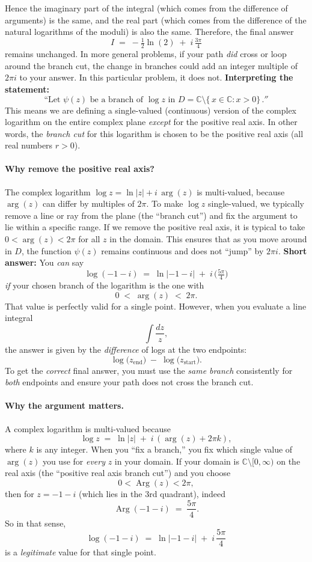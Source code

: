 \documentclass[12pt]{article}
\DeclareMathOperator{\Arg}{Arg}
\theoremstyle{definition} %
\theoremstyle{plain} %
\begin{document}
Hence the imaginary part of the integral (which comes from the difference of arguments) is the same, and the real part (which comes from the difference of the natural logarithms of the moduli) is also the same.  Therefore, the final answer
\[
I
\;=\;
-\tfrac{1}{2}\ln(2)
\;+\;
i\,\tfrac{3\pi}{4}
\]
remains unchanged.  In more general problems, if your path \emph{did} cross or loop around the branch cut, the change in branches could add an integer multiple of $2\pi i$ to your answer.  In this particular problem, it does not.
\textbf{Interpreting the statement:}\\
\[
\text{``Let }\psi(z)\text{ be a branch of }\log z\text{ in }
D = \mathbb{C} \setminus \{\,x \in \mathbb{C} : x > 0\}\,.'' 
\]
This means we are defining a single-valued (continuous) version of the complex logarithm on the entire complex plane \emph{except} for the positive real axis. In other words, the \emph{branch cut} for this logarithm is chosen to be the positive real axis (all real numbers $r>0$). 

\paragraph{Why remove the positive real axis?} 
The complex logarithm $\log z = \ln|z| + i \,\arg(z)$ is multi-valued, because $\arg(z)$ can differ by multiples of $2\pi$. To make $\log z$ single-valued, we typically remove a line or ray from the plane (the ``branch cut'') and fix the argument to lie within a specific range. If we remove the positive real axis, it is typical to take $0 < \arg(z) < 2\pi$ for all $z$ in the domain. This ensures that as you move around in $D$, the function $\psi(z)$ remains continuous and does not ``jump'' by $2\pi i.$
\noindent
\textbf{Short answer:} You \emph{can} say
\[
\log(-1 - i) \;=\; \ln\!\bigl|{-1 - i}\bigr| \;+\; i\,\bigl(\tfrac{5\pi}{4}\bigr)
\]
\emph{if} your chosen branch of the logarithm is the one with
\[
0 \;<\; \arg(z) \;<\; 2\pi.
\]
That value is perfectly valid for a single point.  However, when you evaluate a line integral
\[
\int \frac{dz}{z},
\]
the answer is given by the \emph{difference} of logs at the two endpoints:
\[
\log\bigl(z_{\text{end}}\bigr)\;-\;\log\bigl(z_{\text{start}}\bigr).
\]
To get the \emph{correct} final answer, you must use the \emph{same branch} consistently for \emph{both} endpoints and ensure your path does not cross the branch cut.  

\paragraph{Why the argument matters.}
A complex logarithm is multi-valued because
\[
\log z \;=\;\ln|z|\;+\;i\,(\arg(z) + 2\pi k),
\]
where $k$ is any integer.  When you ``fix a branch,'' you fix which single value of $\arg(z)$ you use for \emph{every} $z$ in your domain.  If your domain is $\mathbb{C}\setminus[0,\infty)$ on the real axis (the ``positive real axis branch cut'') and you choose 
\[
0 < \Arg(z) < 2\pi,
\]
then for $z=-1-i$ (which lies in the 3rd quadrant), indeed
\[
\Arg(-1-i) \;=\;\frac{5\pi}{4}.
\]
So in that sense,
\[
\log(-1 - i)
\;=\;
\ln\!\bigl|{-1 - i}\bigr|
\;+\;
i\,\frac{5\pi}{4}
\]
is a \emph{legitimate} value for that single point.
\end{document}
